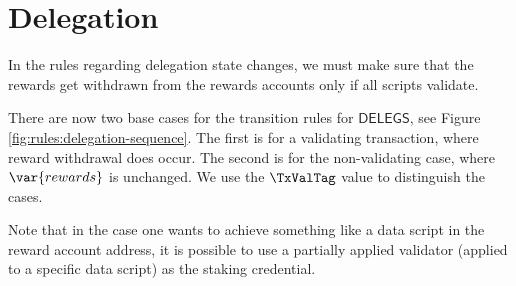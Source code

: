 \section{Delegation}
\label{sec:delegation-shelley}

In the rules regarding delegation state changes, we must make sure that the
rewards get withdrawn from the rewards accounts only if all scripts
validate.

There are now two base cases for the transition rules for $\mathsf{DELEGS}$,
see Figure \ref{fig:rules:delegation-sequence}. The first is for a validating
transaction, where reward withdrawal does occur. The second is for the non-validating
case, where $\var{rewards}$ is unchanged. We use the $\TxValTag$ value to
distinguish the cases.

Note that in the case one wants to achieve something like a data script
in the reward account address, it is possible to use a partially applied
validator (applied to a specific data script) as the staking credential.

